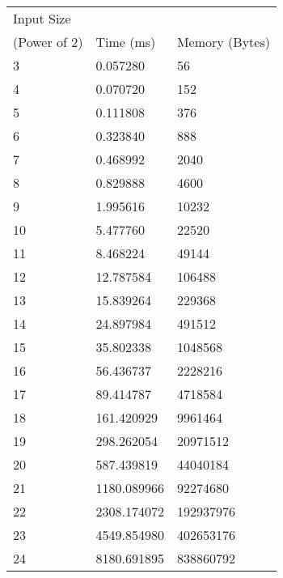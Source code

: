 \documentclass[10pt,a4paper]{article}
\begin{document}
\begin{tabular}{l || l | l}
Input Size\\(Power of 2) & Time (ms) & Memory (Bytes)\\
\hline
3 & 0.057280 & 56\\
4 & 0.070720 & 152\\
5 & 0.111808 & 376\\
6 & 0.323840 & 888\\
7 & 0.468992 & 2040\\
8 & 0.829888 & 4600\\
9 & 1.995616 & 10232\\
10 & 5.477760 & 22520\\
11 & 8.468224 & 49144\\
12 & 12.787584 & 106488\\
13 & 15.839264 & 229368\\
14 & 24.897984 & 491512\\
15 & 35.802338 & 1048568\\
16 & 56.436737 & 2228216\\
17 & 89.414787 & 4718584\\
18 & 161.420929 & 9961464\\
19 & 298.262054 & 20971512\\
20 & 587.439819 & 44040184\\
21 & 1180.089966 & 92274680\\
22 & 2308.174072 & 192937976\\
23 & 4549.854980 & 402653176\\
24 & 8180.691895 & 838860792\\
\end{tabular}
\end{document}
